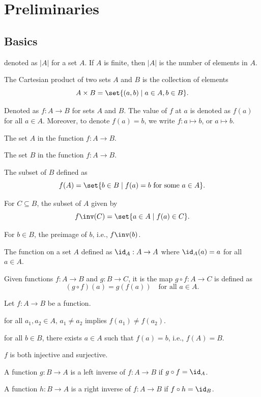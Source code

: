 \setcounter{section}{-1}

\section{Preliminaries}

\subsection{Basics}

 denoted as $|A|$ for a set $A$.
If $A$ is finite, then $|A|$ is the number of elements in $A$.

 The Cartesian product of two sets $A$ and $B$ is the collection of elements
\[
    A \times B = \set{(a, b) \mid a \in A, b \in B}.
\]

\begin{groupdef}
     Denoted as $f : A \to B$ for sets $A$ and $B$. The value of $f$ at $a$ is denoted as $f(a)$ for all $a \in A$. Moreover, to denote $f(a) = b$, we write $f : a \mapsto b$, or $a \mapsto b$.

     The set $A$ in the function $f : A \to B$.

     The set $B$ in the function $f : A \to B$.

     The subset of $B$ defined as
    \[
        f(A) = \set{b \in B \mid f(a) = b \text{ for some } a \in A}.
    \]

     For $C \subseteq B$, the subset of $A$ given by
    \[
        f\inv(C) = \set{a \in A \mid f(a) \in C}.
    \]

     For $b \in B$, the preimage of $b$, i.e., $f\inv(b)$.
\end{groupdef}
 The function on a set $A$ defined as $\id_A : A \to A$ where $\id_A(a) = a$ for all $a \in A$.

 Given functions $f : A \to B$ and $g : B \to C$, it is the map $g \circ f : A \to C$ is defined as
\[
    (g \circ f)(a) = g(f(a)) \quad \text{for all } a \in A.
\]
\begin{groupdef}
    Let $f : A \to B$ be a function.

     for all $a_1, a_2 \in A$, $a_1 \neq a_2$ implies $f(a_1) \neq f(a_2)$.

     for all $b \in B$, there exists $a \in A$ such that $f(a) = b$, i.e., $f(A) = B$.

     $f$ is both injective and surjective.

     A function $g : B \to A$ is a left inverse of $f : A \to B$ if $g \circ f = \id_A$.

     A function $h : B \to A$ is a right inverse of $f : A \to B$ if $f \circ h = \id_B$.
\end{groupdef}

